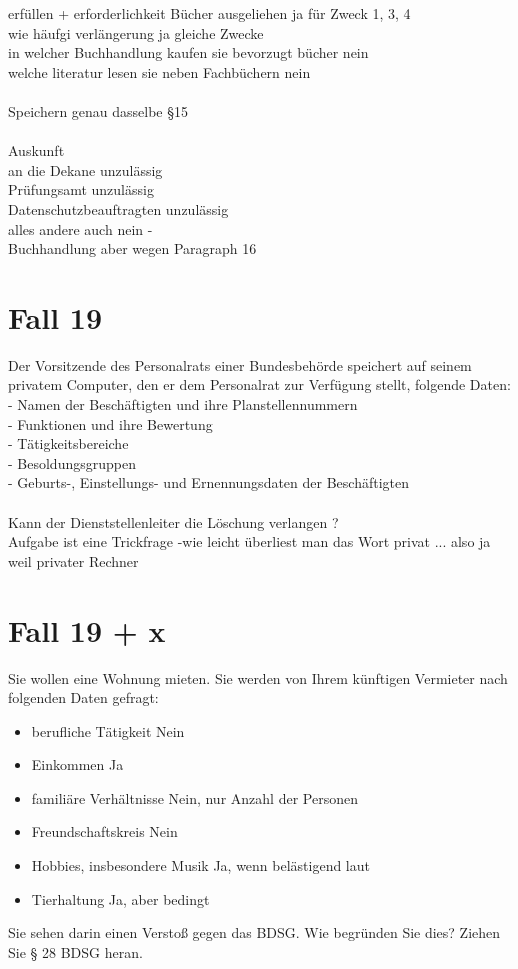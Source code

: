 \documentclass[a4paper,10pt]{scrartcl}
\begin{document}
 erfüllen + erforderlichkeit
 Bücher ausgeliehen ja für Zweck  1, 3, 4\\
 wie häufgi verlängerung ja gleiche Zwecke\\
 in welcher Buchhandlung kaufen sie bevorzugt bücher nein\\
 welche literatur lesen sie neben Fachbüchern nein\\
 \\
 Speichern genau dasselbe §15\\
 \\
 Auskunft\\
 
 an die Dekane unzulässig\\
 Prüfungsamt unzulässig\\
 Datenschutzbeauftragten unzulässig\\
 alles andere auch nein -\\
 
 Buchhandlung aber wegen Paragraph 16
 
 \section{Fall 19}
 
 Der Vorsitzende des Personalrats einer Bundesbehörde speichert auf seinem 
privatem Computer, den er dem Personalrat zur Verfügung stellt, folgende 
Daten:\\
	  - Namen der Beschäftigten und ihre Planstellennummern\\
       - Funktionen und ihre Bewertung\\
       - Tätigkeitsbereiche\\
       - Besoldungsgruppen\\	
	  - Geburts-, Einstellungs- und  Ernennungsdaten der Beschäftigten \\
\\
Kann der Dienststellenleiter die Löschung verlangen ?\\

Aufgabe ist eine Trickfrage -wie leicht überliest man das Wort privat ... also ja weil privater Rechner
 
 
\section{Fall 19 + x}
Sie wollen eine Wohnung mieten. Sie werden von Ihrem künftigen 
Vermieter nach folgenden Daten gefragt: \\
\begin{itemize}
 \item berufliche Tätigkeit Nein
 \item Einkommen Ja
 \item familiäre Verhältnisse Nein, nur Anzahl der Personen
 \item Freundschaftskreis Nein
 \item Hobbies, insbesondere Musik Ja, wenn belästigend laut
 \item Tierhaltung Ja, aber bedingt
\end{itemize}

Sie sehen darin einen Verstoß gegen das BDSG. Wie begründen Sie
dies? Ziehen Sie § 28 BDSG heran. \\
\end{document}
